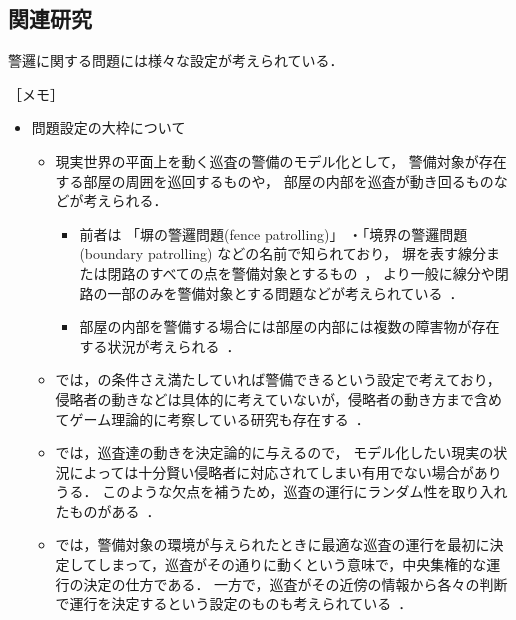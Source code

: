 \subsection*{関連研究}

警邏に関する問題には様々な設定が考えられている．

［メモ］
\begin{itemize}

  \item 問題設定の大枠について
  \begin{itemize}
    \item 現実世界の平面上を動く巡査の警備のモデル化として，
      警備対象が存在する部屋の周囲を巡回するものや，
      部屋の内部を巡査が動き回るものなどが考えられる．
    \begin{itemize}
      \item 
        前者は
        「塀の警邏問題(fence patrolling)」
        ・「境界の警邏問題(boundary patrolling)
        などの名前で知られており，
        塀を表す線分または閉路のすべての点を警備対象とするもの~\cite{czyzowicz2011boundary, dumitrescu2014fence, kawamura2015fence}，
        より一般に線分や閉路の一部のみを警備対象とする問題などが考えられている~\cite{collins2013optimal}．
      \item 
        部屋の内部を警備する場合には部屋の内部には複数の障害物が存在する状況が考えられる~\cite{}．
        
    \end{itemize}
    \item {\patProb}では，{\maxIdletime}の条件さえ満たしていれば警備できるという設定で考えており，侵略者の動きなどは具体的に考えていないが，侵略者の動き方まで含めてゲーム理論的に考察している研究も存在する~\cite{brazdil2015strategy, papadaki2016patrolling}．
    \item {\patProb}では，巡査達の動きを決定論的に与えるので，
    モデル化したい現実の状況によっては十分賢い侵略者に対応されてしまい有用でない場合がありうる．
    このような欠点を補うため，巡査の運行にランダム性を取り入れたものがある~\cite{}．
    \item {\patProb}では，警備対象の環境が与えられたときに最適な巡査の運行を最初に決定してしまって，巡査がその通りに動くという意味で，中央集権的な運行の決定の仕方である．
    一方で，巡査がその近傍の情報から各々の判断で運行を決定するという設定のものも考えられている~\cite{}．
  \end{itemize}


\end{itemize}
